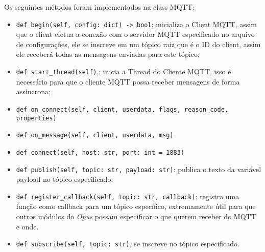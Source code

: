 Os seguintes métodos foram implementados na class MQTT:
\begin{itemize}
    \item \lstinline{def begin(self, config: dict) -> bool}:
    inicializa o Client MQTT, assim que o client efetua a conexão com o servidor MQTT especificado 
    no arquivo de configurações, ele se inscreve em um tópico raiz que é o ID do client, 
    assim ele receberá todas as mensagens enviadas para este tópico;

    \item \lstinline{def start_thread(self)},:
    inicia a Thread do Cliente MQTT, isso é necessário para que o cliente MQTT 
    possa receber mensagens de forma assíncrona;

    \item \lstinline{def on_connect(self, client, userdata, flags, reason_code, properties)}

    \item \lstinline{def on_message(self, client, userdata, msg)}

    \item \lstinline{def connect(self, host: str, port: int = 1883)}

    \item \lstinline{def publish(self, topic: str, payload: str)}:
    publica o texto da variável payload no tópico especificado;

    \item \lstinline{def register_callback(self, topic: str, callback)}:
    registra uma função como callback para um tópico específico, 
    extremamente útil para que outros módulos do \emph{Opus} possam especificar
    o que querem receber do MQTT e onde.

    \item \lstinline{def subscribe(self, topic: str)}, se inscreve no tópico especificado.
\end{itemize}